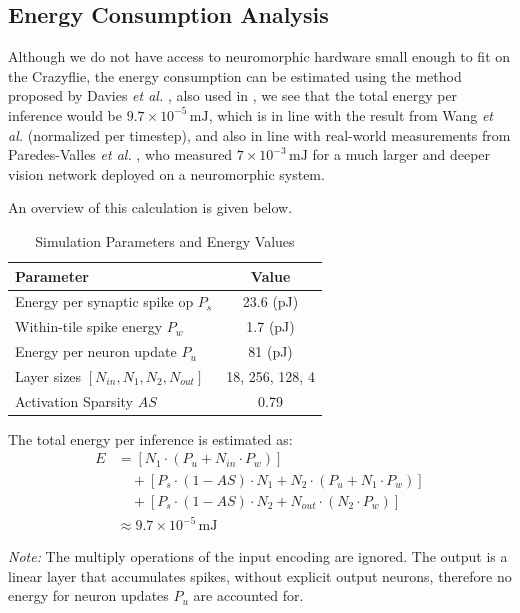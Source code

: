 \subsection{Energy Consumption Analysis}\label{sup:energy}
Although we do not have access to neuromorphic hardware small enough to fit on the Crazyflie, the energy consumption can be estimated using the method proposed by Davies \textit{et al.} \cite{Davies2018}, also used in \cite{wang2023evolving}, we see that the total energy per inference would be $9.7 \times 10^{-5}\,\mathrm{mJ}$, which is in line with the result from Wang \textit{et al.} \cite{wang2023evolving} (normalized per timestep), and also in line with real-world measurements from Paredes-Valles \textit{et al.} \cite{Paredes2023}, who measured $7 \times 10^{-3}\,\mathrm{mJ}$ for a much larger and deeper vision network deployed on a neuromorphic system.

An overview of this calculation is given below.

\begin{table}[h!]
\centering
\caption{Simulation Parameters and Energy Values}
\begin{tabular}{l c}
\toprule
\textbf{Parameter} & \textbf{Value} \\
\midrule
Energy per synaptic spike op $P_s$ & 23.6 (pJ) \\
Within-tile spike energy $P_w$ & 1.7 (pJ) \\
Energy per neuron update $P_u$ & 81 (pJ) \\
Layer sizes $[N_{in}, N_1, N_2, N_{out}]$ & 18, 256, 128, 4 \\
Activation Sparsity $AS$ & 0.79 \\
\bottomrule
\end{tabular}
\end{table}

\noindent The total energy per inference is estimated as:
\begin{align*}
E &= [N_1 \cdot (P_u + N_{in} \cdot P_w)] \\
&\quad + [P_s \cdot (1 - AS) \cdot N_1 + N_2 \cdot (P_u + N_1 \cdot P_w)] \\
&\quad + [P_s \cdot (1 - AS) \cdot N_2 + N_{out} \cdot (N_2 \cdot P_w)] \\
&\approx 9.7 \times 10^{-5}\,\mathrm{mJ}
\end{align*}

\noindent \textit{Note:} The multiply operations of the input encoding are ignored. The output is a linear layer that accumulates spikes, without explicit output neurons, therefore no energy for neuron updates $P_u$ are accounted for.

